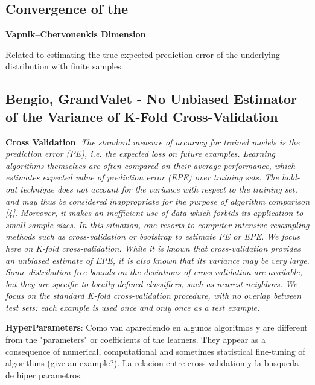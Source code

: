 \subsection{Convergence of the }
\textbf{Vapnik–Chervonenkis Dimension}
\cite{vapnik-nature2013}
\cite{cherkassky-learning2007}

Related to estimating the true expected prediction error of the underlying distribution with finite samples.



\subsection{Bengio, GrandValet - No Unbiased Estimator of the Variance of K-Fold Cross-Validation}
\textbf{Cross Validation}: 
\textit{The standard measure of accuracy for trained models is the prediction error (PE), i.e. the expected loss on future examples. Learning algorithms themselves are often compared on their average performance, which estimates expected value of prediction error (EPE) over training sets.
The hold-out technique does not account for the variance with respect to the training set, and may thus be considered inappropriate for the purpose of algorithm comparison [4]. Moreover, it makes an inefficient use of data which forbids its application to small sample sizes. In this situation, one resorts to computer intensive resampling methods such as cross-validation or bootstrap to estimate PE or EPE. We focus here on K-fold cross-validation. While it is known that cross-validation provides an unbiased estimate of EPE, it is also known that its variance may be very large.
Some distribution-free bounds on the deviations of cross-validation are available, but they are specific to locally defined classifiers, such as nearest neighbors.
We focus on the standard K-fold cross-validation procedure, with no overlap between test sets: each example is used once and only once as a test example.
}


\textbf{HyperParameters}:
Como van apareciendo en algunos algoritmos y are different from the "parameters" or coefficients of the learners. They appear as a consequence of numerical, computational and sometimes statistical fine-tuning of algorithms (give an example?). 
La relacion entre cross-validation y la busqueda de hiper parametros. 

\textit{}

\textit{}


